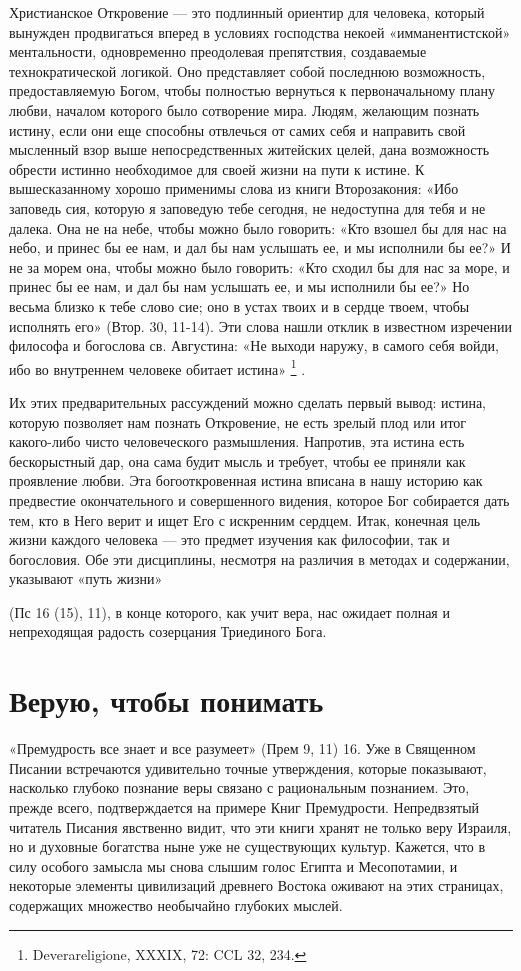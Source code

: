 \documentclass[a5paper,10pt]{article}
\begin{document}
Христианское Откровение — это подлинный ориентир для человека, который вынужден
продвигаться вперед в условиях господства некоей «имманентистской»
ментальности, одновременно преодолевая препятствия, создаваемые
технократической логикой. Оно представляет собой последнюю возможность,
предоставляемую Богом, чтобы полностью вернуться к первоначальному плану любви,
началом которого было сотворение мира. Людям, желающим познать истину, если они
еще способны отвлечься от самих себя и направить свой мысленный взор выше
непосредственных житейских целей, дана возможность обрести истинно необходимое
для своей жизни на пути к истине. К вышесказанному хорошо применимы слова из
книги Второзакония: «Ибо заповедь сия, которую я заповедую тебе сегодня, не
недоступна для тебя и не далека. Она не на небе, чтобы можно было говорить:
«Кто взошел бы для нас на небо, и принес бы ее нам, и дал бы нам услышать ее, и
мы исполнили бы ее?» И не за морем она, чтобы можно было говорить: «Кто сходил
бы для нас за море, и принес бы ее нам, и дал бы нам услышать ее, и мы
исполнили бы ее?» Но весьма близко к тебе слово сие; оно в устах твоих и в
сердце твоем, чтобы исполнять его» (Втор. 30, 11-14). Эти слова нашли отклик в
известном изречении философа и богослова св. Августина: «Не выходи наружу, в
самого себя войди, ибо во внутреннем человеке обитает истина»
\footnote{Deverareligione, XXXIX, 72: CCL 32, 234.} .

Их этих предварительных рассуждений можно сделать первый вывод: истина, которую
позволяет нам познать Откровение, не есть зрелый плод или итог какого-либо
чисто человеческого размышления. Напротив, эта истина есть бескорыстный дар,
она сама будит мысль и требует, чтобы ее приняли как проявление любви. Эта
богооткровенная истина вписана в нашу историю как предвестие окончательного и
совершенного видения, которое Бог собирается дать тем, кто в Него верит и ищет
Его с искренним сердцем. Итак, конечная цель жизни каждого человека — это
предмет изучения как философии, так и богословия. Обе эти дисциплины, несмотря
на различия в методах и содержании, указывают «путь жизни»

(Пс 16 (15), 11), в конце которого, как учит вера, нас ожидает полная и
непреходящая радость созерцания Триединого Бога.

\section{Верую, чтобы понимать}

«Премудрость все знает и все разумеет» (Прем 9, 11) 16. Уже в Священном Писании
встречаются удивительно точные утверждения, которые показывают, насколько
глубоко познание веры связано с рациональным познанием. Это, прежде всего,
подтверждается на примере Книг Премудрости. Непредвзятый читатель Писания
явственно видит, что эти книги хранят не только веру Израиля, но и духовные
богатства ныне уже не существующих культур. Кажется, что в силу особого замысла
мы снова слышим голос Египта и Месопотамии, и некоторые элементы цивилизаций
древнего Востока оживают на этих страницах, содержащих множество необычайно
глубоких мыслей.
\end{document}
